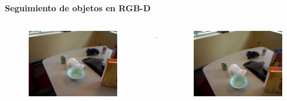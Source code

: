 \documentclass[]{beamer}
\begin{document}
\begin{frame}{}
    \textbf{Seguimiento de objetos en  RGB-D}
    \begin{columns}
        \begin{column}{3cm}
            \begin{figure}[t]
                \centering
                \includegraphics[width=\textwidth]{img/rafaga/1.png}
            \end{figure}
        \end{column}

        \begin{column}{0.5cm}
            \centering
            $\rightarrow$
        \end{column}

        \begin{column}{3cm}
            \begin{figure}[t]
                \centering
                \includegraphics[width=\textwidth]{img/rafaga/2.png}
            \end{figure}
        \end{column}


\end{columns}
\end{frame}
\end{document}
